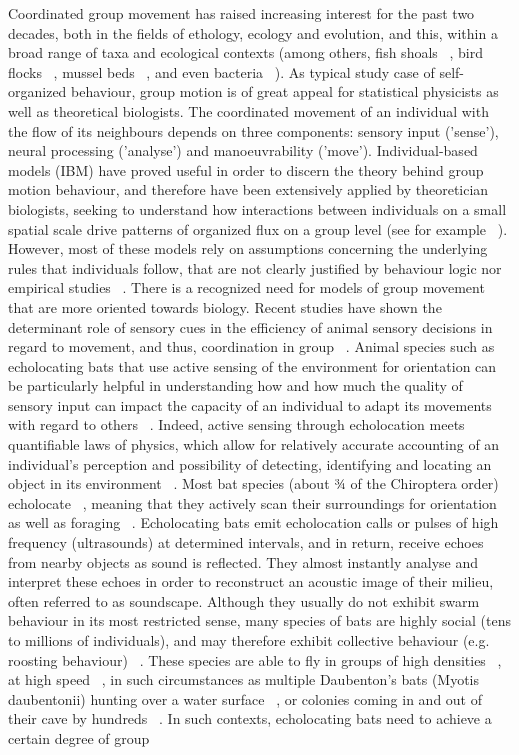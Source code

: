 \documentclass[12pt]{article}
\begin{document}
Coordinated group movement has raised increasing interest for the past two decades, both in the fields of ethology, ecology and evolution, and this, within a broad range of taxa and ecological contexts (among others, fish shoals ~\cite{Lopez2012}, bird flocks ~\cite{Cavagna2010}, mussel beds ~\cite{Liu2014}, and even bacteria ~\cite{Zhang2010}). As typical study case of self-organized behaviour, group motion is of great appeal for statistical physicists as well as theoretical biologists. The coordinated movement of an individual with the flow of its neighbours depends on three components: sensory input ('sense'), neural processing ('analyse') and manoeuvrability ('move'). Individual-based models (IBM) have proved useful in order to discern the theory behind group motion behaviour, and therefore have been extensively applied by theoretician biologists, seeking to understand how interactions between individuals on a small spatial scale drive patterns of organized flux on a group level (see for example ~\cite{Accolla2015}). However, most of these models rely on assumptions concerning the underlying rules that individuals follow, that are not clearly justified by behaviour logic nor empirical studies ~\cite{Lopez2012}. There is a recognized need for models of group movement that are more oriented towards biology. Recent studies have shown the determinant role of sensory cues in the efficiency of animal sensory decisions in regard to movement, and thus, coordination in group ~\cite{Partridge1980,Ballerini2008,Strandburg-Peshkin2013}. Animal species such as echolocating bats that use active sensing of the environment for orientation can be particularly helpful in understanding how and how much the quality of sensory input can impact the capacity of an individual to adapt its movements with regard to others ~\cite{Lin2015,Giuggioli2015}. Indeed, active sensing through echolocation meets quantifiable laws of physics, which allow for relatively accurate accounting of an individual’s perception and possibility of detecting, identifying and locating an object in its environment ~\cite{Rossing2007,Prandoni2008a}. Most bat species (about ¾ of the Chiroptera order) echolocate ~\cite{Surlykke2014}, meaning that they actively scan their surroundings for orientation as well as foraging ~\cite{Schnitzler2003}. Echolocating bats emit echolocation calls or pulses of high frequency (ultrasounds) at determined intervals, and in return, receive echoes from nearby objects as sound is reflected. They almost instantly analyse and interpret these echoes in order to reconstruct an acoustic image of their milieu, often referred to as soundscape. Although they usually do not exhibit swarm behaviour in its most restricted sense, many species of bats are highly social (tens to millions of individuals), and may therefore exhibit collective behaviour (e.g. roosting behaviour) ~\cite{Kunz2005}. These species are able to fly in groups of high densities ~\cite{Betke2007,Gillam2010}, at high speed ~\cite{Theriault2010}, in such circumstances as multiple Daubenton’s bats (Myotis daubentonii) hunting over a water surface ~\cite{Kalko&Schnitzler1989}, or colonies coming in and out of their cave by hundreds ~\cite{Rivers2006,Lee2001}. In such contexts, echolocating bats need to achieve a certain degree of group 
\end{document}
